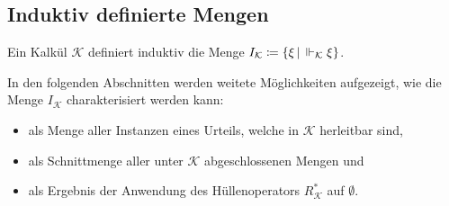 		\subsection{Induktiv definierte Mengen}
			Ein Kalkül $ \mathcal{K} $ definiert induktiv die Menge $ I _ \mathcal{K} \coloneqq \{ \xi \,\vert\, \Vdash _ \mathcal{K} \xi \} $.

			In den folgenden Abschnitten werden weitete Möglichkeiten aufgezeigt, wie die Menge $ I _ \mathcal{K} $ charakterisiert werden kann:
			\begin{itemize}
				\item als Menge aller Instanzen eines Urteils, welche in $ \mathcal{K} $ herleitbar sind,
				\item als Schnittmenge aller unter $ \mathcal{K} $ abgeschlossenen Mengen und
				\item als Ergebnis der Anwendung des Hüllenoperators $ R _ \mathcal{K} ^ * $ auf $ \emptyset $.
			\end{itemize}

